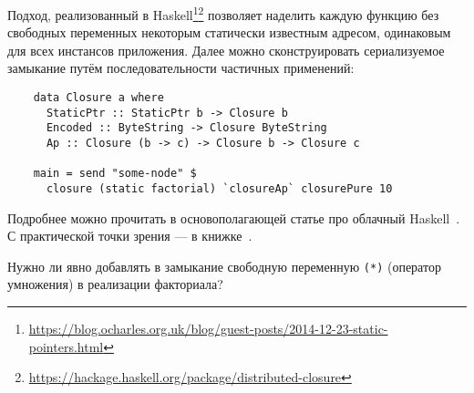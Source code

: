Подход, реализованный в Haskell\footnote{\url{https://blog.ocharles.org.uk/blog/guest-posts/2014-12-23-static-pointers.html}}\footnote{\url{https://hackage.haskell.org/package/distributed-closure}} позволяет наделить каждую функцию без свободных переменных некоторым статически известным адресом, одинаковым для всех инстансов приложения.
Далее можно сконструировать сериализуемое замыкание путём последовательности частичных применений:
\begin{verbatim}
    data Closure a where
      StaticPtr :: StaticPtr b -> Closure b
      Encoded :: ByteString -> Closure ByteString
      Ap :: Closure (b -> c) -> Closure b -> Closure c

    main = send "some-node" $
      closure (static factorial) `closureAp` closurePure 10
\end{verbatim}

Подробнее можно прочитать в основополагающей статье про облачный Haskell~\cite{epstein2011towards}.
С практической точки зрения --- в книжке~\cite[глава 16]{marlow2011parallel}.

\begin{task}
    Нужно ли явно добавлять в замыкание свободную переменную \texttt{(*)} (оператор умножения) в реализации факториала?
\end{task}
